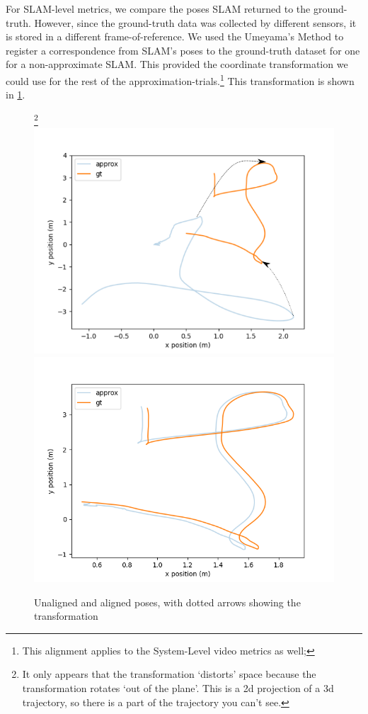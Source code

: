 For SLAM-level metrics, we compare the poses SLAM returned to the ground-truth.
However, since the ground-truth data was collected by different sensors, it is stored in a different frame-of-reference.
We used the Umeyama's Method to register a correspondence from SLAM's poses to the ground-truth dataset for one for a non-approximate SLAM\cite{88573}.
This provided the coordinate transformation we could use for the rest of the approximation-trials.\footnote{This alignment applies to the System-Level video metrics as well; }
This transformation is shown in \cref{transformation}.

\begin{figure}
  \label{transformation}
  \caption{Unaligned and aligned poses, with dotted arrows showing the transformation}
  \footnote{It only appears that the transformation `distorts' space because the transformation rotates `out of the plane'. This is a 2d projection of a 3d trajectory, so there is a part of the trajectory you can't see.}
  \includegraphics[width=\columnwidth]{unaligned.png}
  \includegraphics[width=\columnwidth]{aligned.png}
\end{figure}

